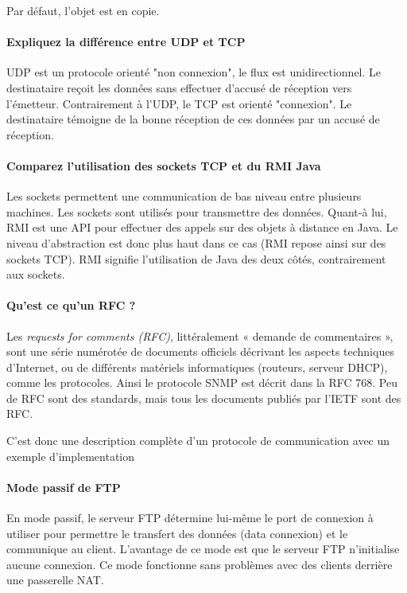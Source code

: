 \documentclass[a4paper]{article}
\begin{document}
Par défaut, l'objet est en copie.

\paragraph{Expliquez la différence entre UDP et TCP}
UDP est un protocole orienté "non connexion", le flux est unidirectionnel. Le destinataire reçoit les données sans effectuer d'accusé de réception vers l'émetteur. Contrairement à l'UDP, le TCP est orienté "connexion". Le destinataire témoigne de la bonne réception de ces données par un accusé de réception.

\paragraph{Comparez l'utilisation des sockets TCP et du RMI Java}
Les sockets permettent une communication de bas niveau entre plusieurs machines. Les sockets sont utilisés pour transmettre des données. Quant-à lui, RMI est une API pour effectuer des appels sur des objets à distance en Java. Le niveau d'abstraction est donc plus haut dans ce cas (RMI repose ainsi sur des sockets TCP). RMI signifie l'utilisation de Java des deux côtés, contrairement aux sockets.

\paragraph{Qu'est ce qu'un RFC ?}
Les \textit{requests for comments (RFC)}, littéralement « demande de commentaires », sont une série numérotée de documents officiels décrivant les aspects techniques d'Internet, ou de différents matériels informatiques (routeurs, serveur DHCP), comme les protocoles. Ainsi le protocole SNMP est décrit dans la RFC 768. Peu de RFC sont des standards, mais tous les documents publiés par l'IETF sont des RFC.

C'est donc une description complète d’un protocole de communication avec un exemple d’implementation

\paragraph{Mode passif de FTP}
En mode passif, le serveur FTP détermine lui-même le port de connexion à utiliser pour permettre le transfert des données (data connexion) et le communique au client. L'avantage de ce mode est que le serveur FTP n'initialise aucune connexion. Ce mode fonctionne sans problèmes avec des clients derrière une passerelle NAT.
\end{document}
